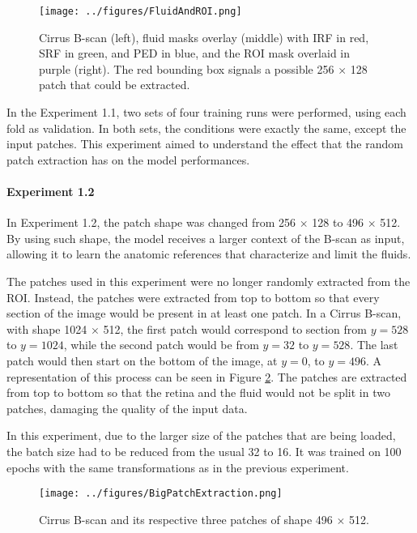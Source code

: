\begin{figure}[!ht]
	\centering
	\texttt{[image: ../figures/FluidAndROI.png]}
	\caption{Cirrus B-scan (left), fluid masks overlay (middle) with IRF in red, SRF in green, and PED in blue, and the ROI mask overlaid in purple (right). The red bounding box signals a possible 256 $\times$ 128 patch that could be extracted.}
	\label{fig:FluidAndROI}
\end{figure}

\par
In the Experiment 1.1, two sets of four training runs were performed, using each fold as validation. In both sets, the conditions were exactly the same, except the input patches. This experiment aimed to understand the effect that the random patch extraction has on the model performances.

\paragraph{Experiment 1.2}
In Experiment 1.2, the patch shape was changed from 256 $\times$ 128 to 496 $\times$ 512. By using such shape, the model receives a larger context of the B-scan as input, allowing it to learn the anatomic references that characterize and limit the fluids.
\par
The patches used in this experiment were no longer randomly extracted from the ROI. Instead, the patches were extracted from top to bottom so that every section of the image would be present in at least one patch. In a Cirrus B-scan, with shape 1024 $\times$ 512, the first patch would correspond to section from $y=528$ to $y=1024$, while the second patch would be from $y=32$ to $y=528$. The last patch would then start on the bottom of the image, at $y=0$, to $y=496$. A representation of this process can be seen in Figure \ref{fig:BigPatchExtraction}. The patches are extracted from top to bottom so that the retina and the fluid would not be split in two patches, damaging the quality of the input data.
\par
In this experiment, due to the larger size of the patches that are being loaded, the batch size had to be reduced from the usual 32 to 16. It was trained on 100 epochs with the same transformations as in the previous experiment.

\begin{figure}[!ht]
	\centering
	\texttt{[image: ../figures/BigPatchExtraction.png]}
	\caption{Cirrus B-scan and its respective three patches of shape 496 $\times$ 512.}
	\label{fig:BigPatchExtraction}
\end{figure}

